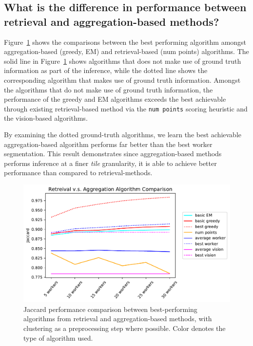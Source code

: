 \subsection{What is the difference in performance between retrieval and aggregation-based methods?}
    Figure~\ref{retreival_vs_aggregation} shows the comparisons between the best performing algorithm amongst aggregation-based (greedy, EM) and retrieval-based (num points) algorithms. The solid line in Figure~\ref{retreival_vs_aggregation} shows algorithms that does not make use of ground truth information as part of the inference, while the dotted line shows the corresponding algorithm that makes use of ground truth information. Amongst the algorithms that do not make use of ground truth information, the performance of the greedy and EM algorithms exceeds the best achievable through existing retrieval-based method via the \texttt{num points} scoring heuristic and the vision-based algorithms. 
    \par By examining the dotted ground-truth algorithms, we learn the best achievable aggregation-based algorithm performs far better than the best worker segmentation. This result demonstrates since aggregation-based methods performs inference at a finer \textit{tile} granularity, it is able to achieve better performance than compared to retrieval-methods.
    \begin{figure}[h!]
      \centering
      \includegraphics[width=\textwidth]{plots/Retreival_vs_Aggregation.pdf}
      \caption{Jaccard performance comparison between best-performing algorithms from retrieval and aggregation-based methods, with clustering as a preprocessing step where possible. Color denotes the type of algorithm used.}
      \label{retreival_vs_aggregation}
    \end{figure}
